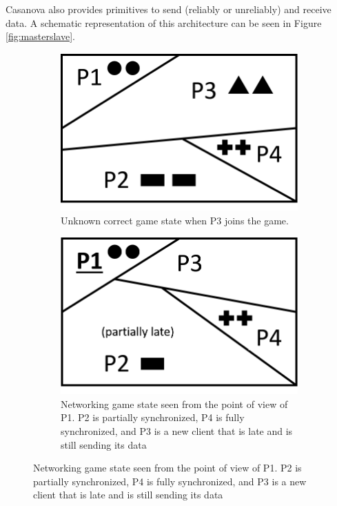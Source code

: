 Casanova also provides primitives to send (reliably or unreliably) and receive data. A schematic representation of this architecture can be seen in Figure \ref{fig:masterslave}.

\begin{figure}[h!]
	\centering
	\caption{Representation of the game world in a networking scenario}
	\label{fig:network_world}
	\begin{subfigure}[t]{0.3\linewidth}
		\centering
		\includegraphics[width=1\linewidth]{Figures/networking2}
		\caption{Unknown correct game state when P3 joins the game.\\}
		\label{subfig:networking_ideal}
	\end{subfigure}
	\begin{subfigure}[t]{0.3\linewidth}
		\centering
		\includegraphics[width=1\linewidth]{Figures/networking1}
		\caption{Networking game state seen from the point of view of P1. P2 is partially synchronized, P4 is fully synchronized, and P3 is a new client that is late and is still sending its data}
		\label{subfig:networking_relative}
	\end{subfigure}
	

\end{figure}

